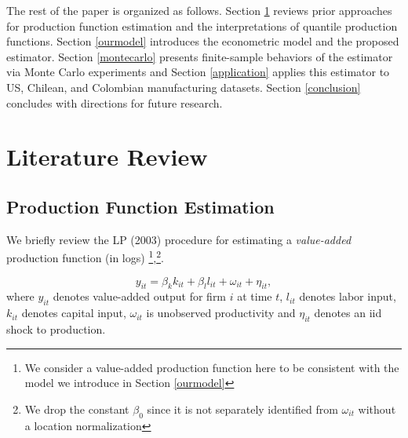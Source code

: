 \documentclass[11pt]{article}
\begin{document}
The rest of the paper is organized as follows. Section \ref{litreview} reviews prior approaches for production function estimation and the interpretations of quantile production functions. Section \ref{ourmodel} introduces the econometric model and the proposed estimator. Section \ref{montecarlo} presents finite-sample behaviors of the estimator via Monte Carlo experiments and Section \ref{application} applies this estimator to US, Chilean, and Colombian manufacturing datasets. Section \ref{conclusion} concludes with directions for future research.

\section{Literature Review} \label{litreview}
\subsection{Production Function Estimation}

We briefly review the LP (2003) procedure for estimating a \textit{value-added} production function (in logs) \footnote{We consider a value-added production function here to be consistent with the model we introduce in Section \ref{ourmodel}},\footnote{We drop the constant $\beta_{0}$ since it is not separately identified from $\omega_{it}$ without a location normalization}.

\begin{equation}
y_{it}=\beta_{k}k_{it}+\beta_{l}l_{it}+\omega_{it}+\eta_{it},
\end{equation}
where $y_{it}$ denotes value-added output for firm $i$ at time $t$, $l_{it}$ denotes labor input, $k_{it}$ denotes capital input, $\omega_{it}$ is unobserved productivity and $\eta_{it}$ denotes an iid shock to production.
\end{document}

